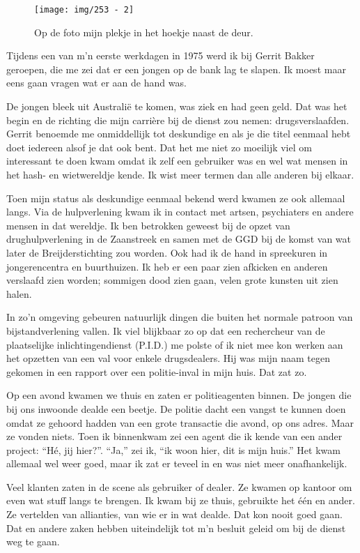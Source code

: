 \documentclass[10pt,twoside, openright]{memoir}
\begin{document}
\begin{figure}
\texttt{[image: img/253 - 2]}
\caption*{\footnotesize Op de foto mijn plekje in het hoekje naast de deur.}
\end{figure}

Tijdens een van m’n eerste werkdagen in 1975 werd ik bij Gerrit Bakker geroepen, die me zei dat er een jongen op de bank lag te slapen. Ik moest maar eens gaan vragen wat er aan de hand was. 

De jongen bleek uit Australië te komen, was ziek en had geen geld. Dat was het begin en de richting die mijn carrière bij de dienst zou nemen: drugsverslaafden. Gerrit benoemde me onmiddellijk tot deskundige en als je die titel eenmaal hebt doet iedereen alsof je dat ook bent. Dat het me niet zo moeilijk viel om interessant te doen kwam omdat ik zelf een gebruiker was en wel wat mensen in het hash- en wietwereldje kende. Ik wist meer termen dan alle anderen bij elkaar. 

Toen mijn status als deskundige eenmaal bekend werd kwamen ze ook allemaal langs. Via de hulpverlening kwam ik in contact met artsen, psychiaters en andere mensen in dat wereldje. Ik ben betrokken geweest bij de opzet van drughulpverlening in de Zaanstreek en samen met de GGD bij de komst van wat later de Breijderstichting zou worden. Ook had ik de hand in spreekuren in jongerencentra en buurthuizen. Ik heb er een paar zien afkicken en anderen verslaafd zien worden; sommigen dood zien gaan, velen grote kunsten uit zien halen. 

In zo’n omgeving gebeuren natuurlijk dingen die buiten het normale patroon van bijstandverlening vallen. Ik viel blijkbaar zo op dat een rechercheur van de plaatselijke  inlichtingendienst (P.I.D.) me polste of ik niet mee kon werken aan het opzetten van een val voor enkele drugsdealers. Hij was mijn naam tegen gekomen in een rapport over een politie-inval in mijn huis. Dat zat zo. 

Op een avond kwamen we thuis en zaten er politieagenten binnen. De jongen die bij ons inwoonde dealde een beetje. De politie dacht een vangst te kunnen doen omdat ze gehoord hadden van een grote transactie die avond, op ons adres. Maar ze vonden niets. Toen ik binnenkwam zei een agent die ik kende van een ander project: ``Hé, jij hier?''. ``Ja,'' zei ik, ``ik woon hier, dit is mijn huis.'' Het kwam allemaal wel weer goed, maar ik zat er teveel in en was niet meer onafhankelijk. 

Veel klanten zaten in de scene als gebruiker of dealer. Ze kwamen op kantoor om even wat stuff langs te brengen. Ik kwam bij ze thuis, gebruikte het één en ander. Ze vertelden van allianties, van wie er in wat dealde. Dat kon nooit goed gaan. Dat en andere zaken hebben uiteindelijk tot m’n besluit geleid om bij de dienst weg te gaan. 
\end{document}
